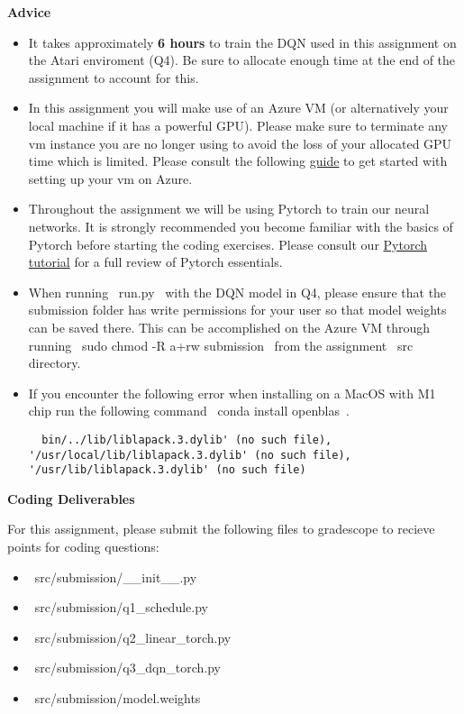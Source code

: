 \textbf{Advice}
\begin{itemize}
  \item It takes approximately \textbf{6 hours} to train the DQN used in this assignment on the Atari enviroment (Q4). Be sure to allocate enough time at the end of the assignment to account for this.

  \item In this assignment you will make use of an Azure VM (or alternatively your local machine if it has a powerful GPU). Please make sure to terminate any vm instance you are no longer using to avoid the loss of your allocated GPU time which is limited. Please consult the following \href{https://github.com/scpd-proed/XCS234-Handouts/blob/main/Azure/Azure%20Guide.pdf}{guide} to get started with setting up your vm on Azure.

  \item Throughout the assignment we will be using Pytorch to train our neural networks. It is strongly recommended you become familiar with the basics of Pytorch before starting the coding exercises. Please consult our \href{https://colab.research.google.com/drive/1BZ89PnXpzN2US_OxwuQCazucmuTpuIfS?usp=sharing}{Pytorch tutorial} for a full review of Pytorch essentials.

  \item When running ~run.py~ with the DQN model in Q4, please ensure that the submission folder has write permissions for your user so that model weights can be saved there. This can be accomplished on the Azure VM through running ~sudo chmod -R a+rw submission~ from the assignment ~src~ directory.

  \item If you encounter the following error when installing on a MacOS with M1 chip run the following command ~conda install openblas~.

  \begin{lstlisting}
  bin/../lib/liblapack.3.dylib' (no such file), '/usr/local/lib/liblapack.3.dylib' (no such file), '/usr/lib/liblapack.3.dylib' (no such file)
  \end{lstlisting}
\end{itemize}


\textbf{Coding Deliverables}

For this assignment, please submit the following files to gradescope to recieve points for coding questions:
\begin{itemize}
    \item ~src/submission/__init__.py~
    \item ~src/submission/q1_schedule.py~
    \item ~src/submission/q2_linear_torch.py~
    \item ~src/submission/q3_dqn_torch.py~
    \item ~src/submission/model.weights~
\end{itemize}
